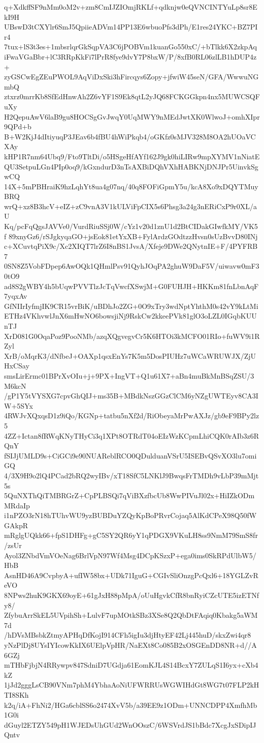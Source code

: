 q+XdkffSF9nMm0oM2v+zm8CmIJZIOmjRKLf+qdknjw0eQVNCINTYuLp8sr8EkI9H
UBswD3tCXYlr6SmJ5QpiieADVm14PP13E6wbuoPfs3dPh/E1res24YKC+BZ7PIr4
7tux+lS3t3es+1mbsrlqrGkSqpVA3C6jPOBVm1kuanGo550xC/+bTlkk6X2zkpAq
iFwaVGaBbr+lC3RRpKkFi7lPrR8fye9dvY7P8bxW/P/8xfB0RL06zlLB1hDUP4z+
zyGSCwEgZEuPWOL9AqViDxSki3hFircqys6Zopy+jfwiW45seN/GFA/WwwuNGmbQ
ztxrz0mrrKb8SfEdHnwAh2Z6vYF1S9Ek8qtL2yJQ68FCKGGkpn4nx5MUWCSQFuXy
H2QepuAwV6laB9gu8HOCSgGvJwqY0UqMWY9nMEdJwtXK0WlwoJ+omhXIpr9QPd+b
B+W2KjJ4dItiyuqP3JEav6b4fBU4hWiPkqb4/oGKfz0sMJV328M8OA2hUOaVCXAy
kHP1R7nm64Ubq9/Fto9TltDi/o5HSgeHfAYf162J9gk0hiLIRw9mpXYMV1nNiatE
QU3SetpuLGn4PIp0oq9/kGxndurD3nTsAXBiDQhVXhHABKNjDNJPr5UinvkSgwCQ
14X+5mPBHraiK9hzLqhYt8ua4g07nq/40q8FOFiGpmY5u/kcA8Xo9xDQYTMuyBRQ
wrQ+xz8B3hcV+eIZ+zC9vnA3V1kULViFpCIX5s6Phsg3a24g3nERiCxP9r0XL/aU
Kq/pcFqQgsJAVVe0/VurdRiuSSj0W/cYz1v20d1znU1d2BtCIDakGIwfkMY/VK5f
89xnyGz6/rSJgkyqaGO+jsEok81etYxXB+FylArdzGOdtzzHvsn0sUzBvvD80INj
c+XCuvtqPiX9c/Xc2XIQT7lrZ6I8nBS1JvsA/Xfeje9DWe2QNytnIE+F/4PYFRB7
0SN8Z5VobFDpep6AwOQk1QHmlPsv91QyhJOqPA2ghuW9DaF5V/uiwavw0mF30tO9
ad8S2gWBY4h5bUqwPVVTlzJcTqVwcfXSwjM+G0FUHJH+HKKm81fnLbnAqF7yqxAv
GfNIIrIyfmjIK9CR15vrBiK/uBDhJo2ZG+0O9xTry3wdNptYhthM0s42vY9kLtMi
ETHz4VKhvwlJnX6mHwNO6bowsjiNj9RskCw2kkeePVk81glO3oLZL0IGqbKUUnTJ
XrD081G0OqaPoz9PooNMb/azqXQgvegvCr5K6HTOi3kMCFO01RIo+fuWV9i1RZyl
XrB/oMqrK3/dNfbeJ+OAXp1qsxEnYs7K5m5DosPIUHz7uWCaWRUWJX/ZjUHxCSay
smsLirErmc01BPrXvOIu+j+9PX+IngVT+Q1u61X7+aBn4muBkMnBSqZSU/3M6kcN
/gP1Y5tVYSXG7cpvGhQIJ+ms35B+MBdkNszGGzClCM6yNZgUWTEyv8CA3IW+5SYx
4RWJvXQxqsD1z9iQo/KGNp+tatbu5nXf2d/RiObeyaMrPwAXJz/gb9eF9BPy2lz5
4ZZ+Ictan8fRWqKNyTHyCi3q1XPt8OTRdT04oEIzWzKCpmLhiCQK0rAIb3z6RQnY
fSIJjUMLD9s+CiGCi9e90NUAReblRCO0QDulduanVSrU5ISEBvQSvXO3lu7omiGQ
4/3X9H9o2lQ4PCad2bRQ2wyIBv/xT18SfC5LNKlJ9BwqsFrTMDh9vLbP39mMjt5s
5QuNXThQiTMBRGrZ+CpPLBSQi7qViBXzfbcUb8WwPIVuJl02x+HiIZkODmMRdaIp
i1nPZO3rN18hTUhvWU9yzBUBDuYZQyKpBoPRvrCojaq5AlKdCPeX98Q50fWGAkpR
mRglgUQkk66+fpS1DHFg+gC5SY2QR6yY1qPDGX9VKuLH8ss9NmM79SmS8fr/zsUr
Ayol3ZNbdVmVOeNag6BrlVpN97Wf4Msg4DCpKSzxP+ega0ims0SkRPdUlbW5/HbB
AsnHD46A9CvpbyA+ufIW58bx+UDk71IguG+CGIvSliOnzgPcQxl6+18YGLZvReVO
8NPws2huK9GKX69oyE+61gJxH88pMpA/oUuHgvkCfR8bnRyiCZcUTE5izETNfy8/
ZfybuArrSkEL5UVpihSh+LulvF7upMOtkSBz3XSe8Q2QbDtFAqiq0Kbakg5aWM7d
/hDVsMBsbkZtmyAPHqDfKojI914CFh5igIu3djHtyEF42Lj445huD/skxZwi4qr8
yNzPlDj8UYsIYIcowKkIX6UElpVpHR/NaEXt8Co085B2xOSGEnDD8NR+d//A6GZj
mTHbFjbjN4RRywpv847SdniD7UGdja61EomKJL4S14BcxY7ZULqS1I6yx+cXb4kZ
1jJd2gggLsCB90VNm7phM4YbhaAoNiUFWRRUsWGWIHdGt8WG7t07FLP2kHTI8SKh
k2q/iA+FhNi2/HGa6cblSS6o2474XvV5b/a39EE9z1ODm+UNNCDPP4XmfhMb1G0i
dGuyl2ETZY549pH1WJEDsUhGUd2WnOOszC/6WSVrdJS1bBdc7XcgJxSDipIJQntv
